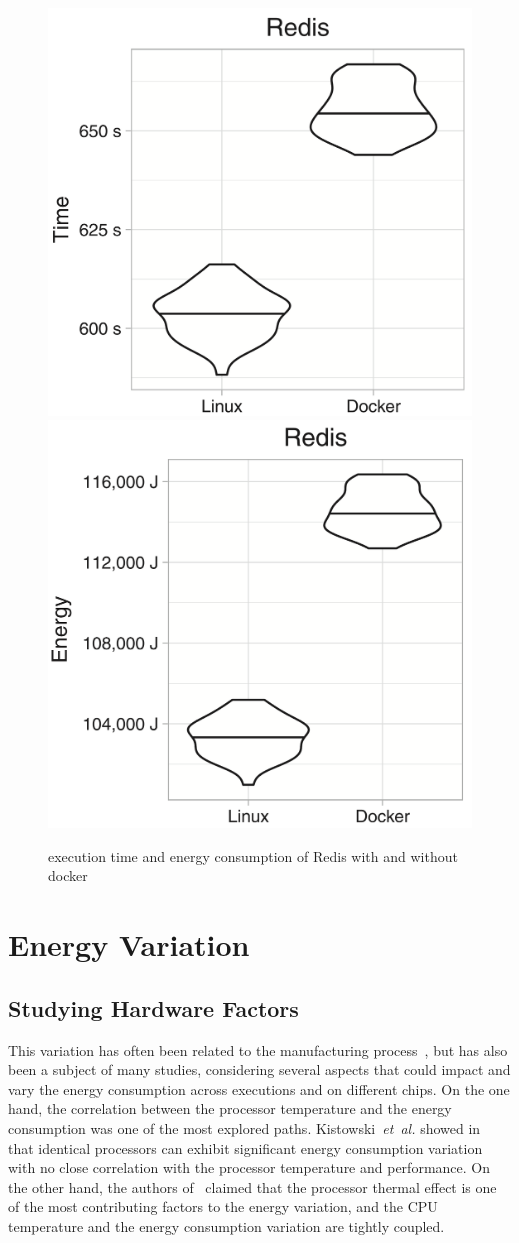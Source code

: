 \begin{figure}
    \includegraphics[width=.5\linewidth]{images/docker_vs_vm_energy_paper/reddis_time}
    \includegraphics[width=.5\linewidth]{images/docker_vs_vm_energy_paper/reddis_energy}
    \caption{execution time and energy consumption of Redis  with and without docker \cite{santos2018does}}\label{fig:docker_reddis}
\end{figure}


\section{Energy Variation}
\subsection{Studying Hardware Factors}
This variation has often been related to the manufacturing process~\cite{coles_comparing_2014}, but has also been a subject of many studies, considering several aspects that could impact and vary the energy consumption across executions and on different chips.
On the one hand, the correlation between the processor temperature and the energy consumption was one of the most explored paths.
Kistowski~\emph{et~al.} showed in~\cite{joakim_v_kisroski_variations_2016} that identical processors can exhibit significant energy consumption variation with no close correlation with the processor temperature and performance.
On the other hand, the authors of~\cite{wang_potential_2018} claimed that the processor thermal effect is one of the most contributing factors to the energy variation, and the CPU temperature and the energy consumption variation are tightly coupled.

